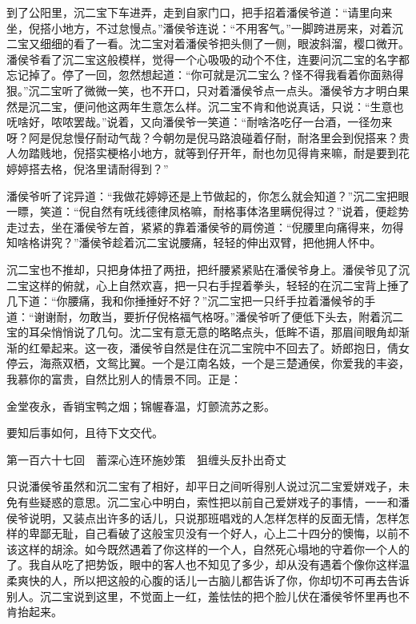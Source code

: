 \documentclass[12pt,UTF8]{ctexbook}
\begin{document}
{{{到了公阳里，沉二宝下车进弄，走到自家门口，把手招着潘侯爷道：“请里向来坐，倪搭小地方，不过怠慢点。”潘侯爷连说：“不用客气。”一脚跨进房来，对着沉二宝又细细的看了一看。沈二宝对着潘侯爷把头侧了一侧，眼波斜溜，樱口微开。潘侯爷看了沉二宝这般模样，觉得一个心吸吸的动个不住，连要问沉二宝的名字都忘记掉了。停了一回，忽然想起道：“你可就是沉二宝么？怪不得我看着你面熟得狠。”沉二宝听了微微一笑，也不开口，只对着潘侯爷点一点头。潘侯爷方才明白果然是沉二宝，便问他这两年生意怎么样。沉二宝不肯和他说真话，只说：“生意也呒啥好，哝哝罢哉。”说着，又向潘侯爷一笑道：“耐啥洛吃仔一台酒，一径勿来呀？阿是倪怠慢仔耐动气哉？今朝勿是倪马路浪碰着仔耐，耐洛里会到倪搭来？贵人勿踏贱地，倪搭实梗格小地方，就等到仔开年，耐也勿见得肯来嘛，耐是要到花婷婷搭去格，倪洛里请耐得到？”

潘侯爷听了诧异道：“我做花婷婷还是上节做起的，你怎么就会知道？”沉二宝把眼一瞟，笑道：“倪自然有呒线德律凤格嘛，耐格事体洛里瞒倪得过？”说着，便趁势走过去，坐在潘侯爷左首，紧紧的靠着潘侯爷的肩傍道：“倪腰里向痛得来，勿得知啥格讲究？”潘侯爷趁着沉二宝说腰痛，轻轻的伸出双臂，把他拥人怀中。

沉二宝也不推却，只把身体扭了两扭，把纤腰紧紧贴在潘侯爷身上。潘侯爷见了沉二宝这样的俯就，心上自然欢喜，把一只右手捏着拳头，轻轻的在沉二宝背上捶了几下道：“你腰痛，我和你捶捶好不好？”沉二宝把一只纤手拉着潘候爷的手道：“谢谢耐，勿敢当，要折仔倪格福气格呀。”潘侯爷听了便低下头去，附着沉二宝的耳朵悄悄说了几句。沈二宝有意无意的略略点头，低眸不语，那眉间眼角却渐渐的红晕起来。这一夜，潘侯爷自然是住在沉二宝院中不回去了。娇郎抱日，倩女停云，海燕双栖，文鸳比翼。一个是江南名妓，一个是三楚通侯，你爱我的丰姿，我慕你的富贵，自然比别人的情景不同。正是：

金堂夜永，香销宝鸭之烟；锦幄春温，灯颤流苏之影。

要知后事如何，且待下文交代。





第一百六十七回　蓄深心连环施妙策　狙缠头反扑出奇丈



只说潘侯爷虽然和沉二宝有了相好，却平日之间听得别人说过沉二宝爱姘戏子，未免有些疑惑的意思。沉二宝心中明白，索性把以前自己爱姘戏子的事情，一一和潘侯爷说明，又装点出许多的话儿，只说那班唱戏的人怎样怎样的反面无情，怎样怎样的卑鄙无耻，自己看破了这般宝贝没有一个好人，心上二十四分的懊悔，以前不该这样的胡涂。如今既然遇着了你这样的一个人，自然死心塌地的守着你一个人的了。我自从吃了把势饭，眼中的客人也不知见了多少，却从没有遇着个像你这样温柔爽快的人，所以把这般的心腹的话儿一古脑儿都告诉了你，你却切不可再去告诉别人。沉二宝说到这里，不觉面上一红，羞怯怯的把个脸儿伏在潘侯爷怀里再也不肯抬起来。

}}}
\end{document}
